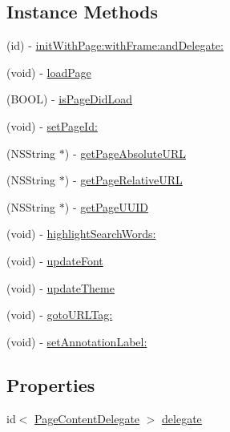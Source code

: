 \subsection*{Instance Methods}
\begin{DoxyCompactItemize}
\item 
(id) -\/ \hyperlink{interface_pxe_player_page_content_view_controller_ac1ee65bf42d314bdfb0e8f6e933ea826}{init\-With\-Page\-:with\-Frame\-:and\-Delegate\-:}
\item 
(void) -\/ \hyperlink{interface_pxe_player_page_content_view_controller_ac48e24862e5965de2e8bb122207a54e7}{load\-Page}
\item 
(B\-O\-O\-L) -\/ \hyperlink{interface_pxe_player_page_content_view_controller_a6e0cc4d9f70477ebac454c4ca421ed46}{is\-Page\-Did\-Load}
\item 
(void) -\/ \hyperlink{interface_pxe_player_page_content_view_controller_a14807e6d4cdaea7a2cc4ba87b7a59e3b}{set\-Page\-Id\-:}
\item 
(N\-S\-String $\ast$) -\/ \hyperlink{interface_pxe_player_page_content_view_controller_ae168e36dd9a9b4d6f613ca0e613a6989}{get\-Page\-Absolute\-U\-R\-L}
\item 
(N\-S\-String $\ast$) -\/ \hyperlink{interface_pxe_player_page_content_view_controller_a12057b213465a87807f385f538184364}{get\-Page\-Relative\-U\-R\-L}
\item 
(N\-S\-String $\ast$) -\/ \hyperlink{interface_pxe_player_page_content_view_controller_aa0c98549d530b0e72cacb71e517d14cc}{get\-Page\-U\-U\-I\-D}
\item 
(void) -\/ \hyperlink{interface_pxe_player_page_content_view_controller_a2ee7ab5ab5d4159e5fd53ca2538e5d6a}{highlight\-Search\-Words\-:}
\item 
(void) -\/ \hyperlink{interface_pxe_player_page_content_view_controller_a5b826204805d08a5ab828230895a4115}{update\-Font}
\item 
(void) -\/ \hyperlink{interface_pxe_player_page_content_view_controller_a1d1a289d82656dec419bdece231cfdfc}{update\-Theme}
\item 
(void) -\/ \hyperlink{interface_pxe_player_page_content_view_controller_a83dc743081b3625226cae810fbe027a5}{goto\-U\-R\-L\-Tag\-:}
\item 
(void) -\/ \hyperlink{interface_pxe_player_page_content_view_controller_a1cd7abe0cc5c6ed1fe9251a8e6e32d43}{set\-Annotation\-Label\-:}
\end{DoxyCompactItemize}
\subsection*{Properties}
\begin{DoxyCompactItemize}
\item 
id$<$ \hyperlink{protocol_page_content_delegate-p}{Page\-Content\-Delegate} $>$ \hyperlink{interface_pxe_player_page_content_view_controller_abc82821b4b3302687cee6029b156f0fd}{delegate}
\end{DoxyCompactItemize}


